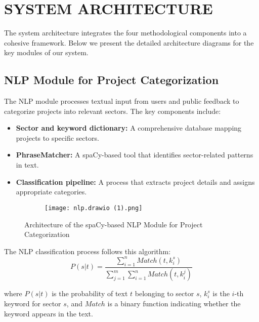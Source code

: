 \documentclass[12pt,a4paper]{report}
\begin{document}
\chapter{SYSTEM ARCHITECTURE}
\indent \indent The system architecture integrates the four methodological components into a cohesive framework. Below we present the detailed architecture diagrams for the key modules of our system.

\section{NLP Module for Project Categorization}
\indent \indent The NLP module processes textual input from users and public feedback to categorize projects into relevant sectors. The key components include:

\begin{itemize}
    \item \textbf{Sector and keyword dictionary:} A comprehensive database mapping projects to specific sectors.
    \item \textbf{PhraseMatcher:} A spaCy-based tool that identifies sector-related patterns in text.
    \item \textbf{Classification pipeline:} A process that extracts project details and assigns appropriate categories.
\end{itemize}

\begin{figure}[H]
    \centering
\begin{figure}
        \centering
        \texttt{[image: nlp.drawio (1).png]}
        \label{fig:enter-label}
    \end{figure}
        \caption{Architecture of the spaCy-based NLP Module for Project Categorization}
    \label{fig:nlp_architecture}
\end{figure}

\noindent The NLP classification process follows this algorithm:
\begin{equation}
P(s|t) = \frac{\sum_{i=1}^{n}Match(t, k_i^s)}{\sum_{j=1}^{m}\sum_{i=1}^{n}Match(t, k_i^j)}
\end{equation}

\noindent where $P(s|t)$ is the probability of text $t$ belonging to sector $s$, $k_i^s$ is the $i$-th keyword for sector $s$, and $Match$ is a binary function indicating whether the keyword appears in the text.
\end{document}
